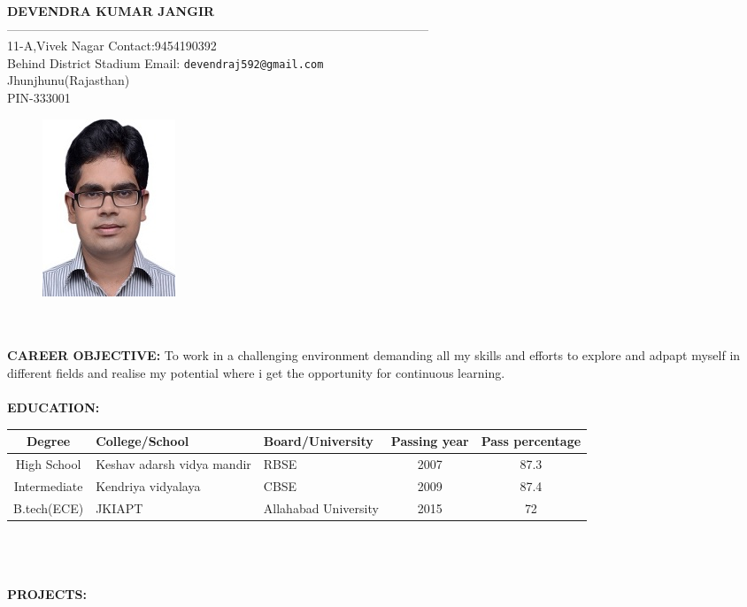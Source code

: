 \documentclass[10pt]{report}
\begin{document}
\qquad \qquad \textbf{DEVENDRA KUMAR JANGIR} \\
------------------------------------------------------------------------------------------------------\\
11-A,Vivek Nagar \quad\quad\qquad\qquad\qquad\qquad\qquad Contact:\mbox{9454190392} \\ 
Behind District Stadium \quad\qquad\qquad\qquad\qquad Email: \texttt{devendraj592@gmail.com} \\
Jhunjhunu(Rajasthan)   \\
PIN-333001    \\
\begin{figure}[h]
\qquad\qquad\qquad\qquad\qquad\qquad\qquad\qquad\qquad\qquad\qquad\qquad
\includegraphics{Dev.jpg}
\end{figure}  \\ \\
\textbf{CAREER OBJECTIVE:} To work in a challenging environment demanding all my skills and efforts to explore and adpapt myself in different fields and realise my potential where i get the opportunity for continuous learning. \\ \\
\textbf{EDUCATION:}  \\
    \begin{tabular}{|c|p{2cm}|p{2.5cm}|c|c|}
    \hline
    Degree & College/School & Board/University & Passing year & Pass percentage  \\
    \hline
    High School & Keshav adarsh vidya mandir & RBSE & 2007 & 87.3 \\
    \hline
    Intermediate & Kendriya vidyalaya & CBSE & 2009 & 87.4  \\
    \hline
    B.tech(ECE) & JKIAPT & Allahabad University & 2015 & 72   \\
    \hline
    \end{tabular}   \\ \\ \\
\textbf{PROJECTS:}
\end{document}
